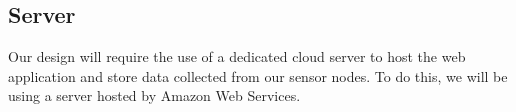 \subsection{Server}
Our design will require the use of a dedicated cloud server to host the web application and store data collected from our sensor nodes. To do this, we will be using a server hosted by Amazon Web Services.
